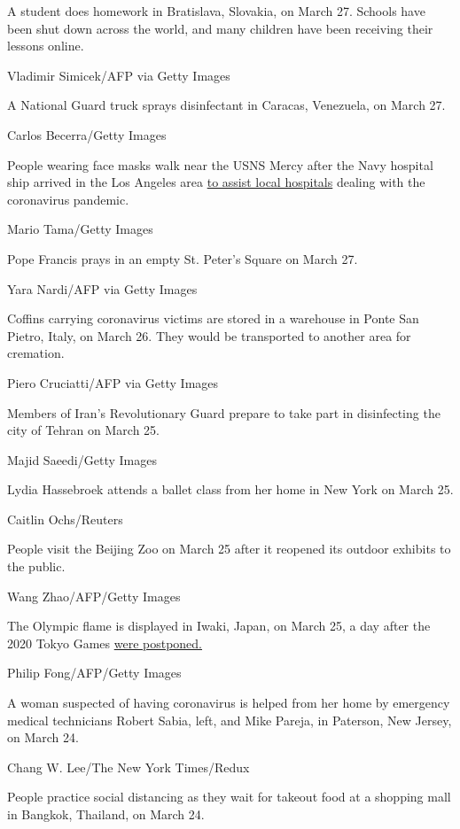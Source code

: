 A student does homework in Bratislava, Slovakia, on March 27. Schools
have been shut down across the world, and many children have been
receiving their lessons online.

Vladimir Simicek/AFP via Getty Images

A National Guard truck sprays disinfectant in Caracas, Venezuela, on
March 27.

Carlos Becerra/Getty Images

People wearing face masks walk near the USNS Mercy after the Navy
hospital ship arrived in the Los Angeles area
\href{https://www.cnn.com/2020/03/27/us/california-hospital-ship-trnd/index.html}{to
assist local hospitals} dealing with the coronavirus pandemic.

Mario Tama/Getty Images

Pope Francis prays in an empty St. Peter's Square on March 27.

Yara Nardi/AFP via Getty Images

Coffins carrying coronavirus victims are stored in a warehouse in Ponte
San Pietro, Italy, on March 26. They would be transported to another
area for cremation.

Piero Cruciatti/AFP via Getty Images

Members of Iran's Revolutionary Guard prepare to take part in
disinfecting the city of Tehran on March 25.

Majid Saeedi/Getty Images

Lydia Hassebroek attends a ballet class from her home in New York on
March 25.

Caitlin Ochs/Reuters

People visit the Beijing Zoo on March 25 after it reopened its outdoor
exhibits to the public.

Wang Zhao/AFP/Getty Images

The Olympic flame is displayed in Iwaki, Japan, on March 25, a day after
the 2020 Tokyo Games
\href{https://edition.cnn.com/2020/03/24/sport/olympics-postponement-tokyo-2020-spt-intl/index.html}{were
postponed.}

Philip Fong/AFP/Getty Images

A woman suspected of having coronavirus is helped from her home by
emergency medical technicians Robert Sabia, left, and Mike Pareja, in
Paterson, New Jersey, on March 24.

Chang W. Lee/The New York Times/Redux

People practice social distancing as they wait for takeout food at a
shopping mall in Bangkok, Thailand, on March 24.

